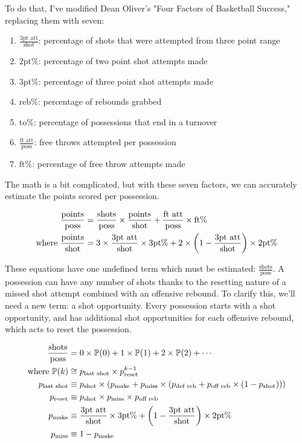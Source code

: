 \documentclass[12 pt]{article}
\begin{document}
\begin{flushleft}
To do that, I've modified Dean Oliver's "Four Factors of Basketball Success," replacing them with seven:
\begin{enumerate}
\item{$ \frac{\text{3pt att}}{\text{shot}} $: percentage of shots that were attempted from three point range}
\item{$ \text{2pt}\% $: percentage of two point shot attempts made}
\item{$ \text{3pt}\% $: percentage of three point shot attempts made}
\item{$ \text{reb}\% $: percentage of rebounds grabbed}
\item{$ \text{to}\% $: percentage of possessions that end in a turnover}
\item{$ \frac{\text{ft att}}{\text{poss}} $: free throws attempted per possession}
\item{$ \text{ft}\% $: percentage of free throw attempts made}
\end{enumerate}

The math is a bit complicated, but with these seven factors, we can accurately estimate the points scored per possession.

\begin{align}
\frac{\text{points}}{\text{poss}} &= \frac{\text{shots}}{\text{poss}} \times \frac{\text{points}}{\text{shot}} + \frac{\text{ft att}}{\text{poss}} \times \text{ft}\% \notag \\
\text{where } \frac{\text{points}}{\text{shot}} &= 3 \times \frac{\text{3pt att}}{\text{shot}} \times \text{3pt}\% + 2 \times \left(1 - \frac{\text{3pt att}}{\text{shot}} \right) \times \text{2pt}\% \notag
\end{align}

These equations have one undefined term which must be estimated: $ \frac{\text{shots}}{\text{poss}} $.
A possession can have any number of shots thanks to the resetting nature of a missed shot attempt combined with an offensive rebound.
To clarify this, we'll need a new term: a shot opportunity. Every possession starts with a shot opportunity, and has additional shot opportunities for each offensive rebound, which acts to reset the possession.

\begin{align}
\frac{\text{shots}}{\text{poss}} &= 0 \times \mathbb{P}(0) + 1 \times \mathbb{P}(1) + 2 \times \mathbb{P}(2) + \cdots \notag \\
\text{where } \mathbb{P}(k) &\cong p_\text{last shot} \times p_\text{reset}^{k - 1} \notag \\
p_\text{last shot} &\equiv p_\text{shot} \times \left( p_\text{make} + p_\text{miss} \times \left(p_\text{def reb} + p_\text{off reb} \times \left(1 - p_\text{shot} \right) \right) \right) \notag \\
p_\text{reset} &\equiv p_\text{shot} \times p_\text{miss} \times p_\text{off reb} \notag \\
p_\text{make} &\equiv \frac{\text{3pt att}}{\text{shot}} \times \text{3pt}\% + \left(1 - \frac{\text{3pt att}}{\text{shot}} \right) \times \text{2pt}\% \notag \\
p_\text{miss} &\equiv 1 - p_\text{make} \notag
\end{align}


\end{flushleft}
\end{document}
